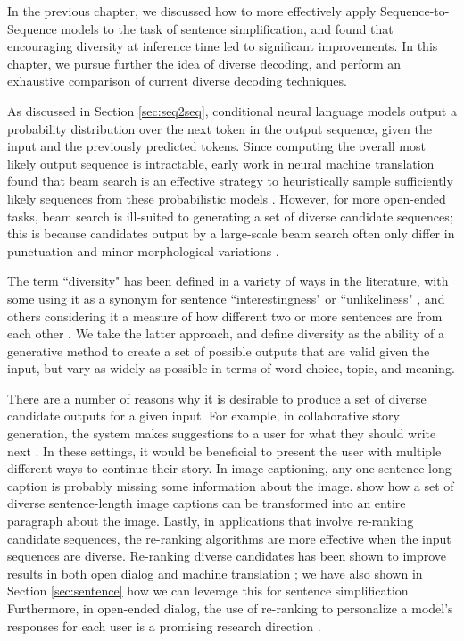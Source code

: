 In the previous chapter, we discussed how to more effectively apply Sequence-to-Sequence models to the task of sentence simplification, and found that encouraging diversity at inference time led to significant improvements. In this chapter, we pursue further the idea of diverse decoding, and perform an exhaustive comparison of current diverse decoding techniques.

As discussed in Section \ref{sec:seq2seq}, conditional neural language models output a probability distribution over the next token in the output sequence, given the input and the previously predicted tokens. Since computing the overall most likely output sequence is intractable, early work in neural machine translation found that beam search is an effective strategy to heuristically sample sufficiently likely sequences from these probabilistic models \citep{sutskever2014sequence}. However, for more open-ended tasks, beam search is ill-suited to generating a set of diverse candidate sequences; this is because candidates output by a large-scale beam search often only differ in punctuation and minor morphological variations \citep{li2016mutual}.

The term ``diversity" has been defined in a variety of ways in the literature, with some using it as a synonym for sentence ``interestingness" or ``unlikeliness" \citep{tatsunori2019unifying}, and others considering it a measure of how different two or more sentences are from each other \citep{vijayakumar2016diverse,gimpel2013systematic}. We take the latter approach, and define diversity as the ability of a generative method to create a set of possible outputs that are valid given the input, but vary as widely as possible in terms of word choice, topic, and meaning.

There are a number of reasons why it is desirable to produce a set of diverse candidate outputs for a given input. For example, in collaborative story generation, the system makes suggestions to a user for what they should write next \citep{clark2018creative}. In these settings, it would be beneficial to present the user with multiple different ways to continue their story. In image captioning, any one sentence-long caption is probably missing some information about the image. \cite{krause2017hierarchical} show how a set of diverse sentence-length image captions can be transformed into an entire paragraph about the image. Lastly, in applications that involve re-ranking candidate sequences, the re-ranking algorithms are more effective when the input sequences are diverse. Re-ranking diverse candidates has been shown to improve results in both open dialog \citep{li2016diversity,li2016mutual} and machine translation \citep{gimpel2013systematic}; we have also shown in Section \ref{sec:sentence} how we can leverage this for sentence simplification. Furthermore, in open-ended dialog, the use of re-ranking to personalize a model's responses for each user is a promising research direction \citep{choudhary2017domain}.

